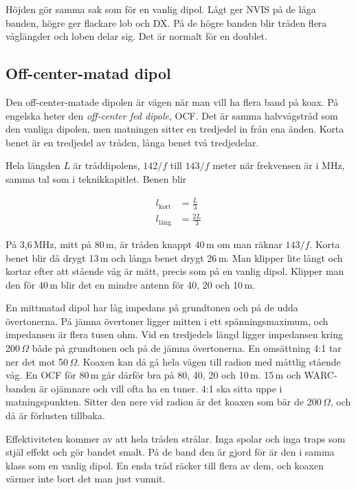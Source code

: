 Höjden gör samma sak som för en vanlig dipol. Lågt ger NVIS på de låga
banden, högre ger flackare lob och DX. På de högre banden blir tråden
flera våglängder och loben delar sig. Det är normalt för en doublet.

\subsection{Off-center-matad dipol}

Den off-center-matade dipolen är vägen när man vill ha flera band på
koax. På engelska heter den \textit{off-center fed dipole}, OCF. Det
är samma halvvågstråd som den vanliga dipolen, men matningen sitter en
tredjedel in från ena änden. Korta benet är en tredjedel av tråden,
långa benet två tredjedelar.

Hela längden $L$ är tråddipolens, $142/f$ till $143/f$ meter när
frekvensen är i MHz, samma tal som i teknikkapitlet. Benen blir

\begin{align}
	l_{\text{kort}} &= \frac{L}{3} \\
	l_{\text{lång}} &= \frac{2L}{3}
\end{align}

På 3,6\,MHz, mitt på 80\,m, är tråden knappt 40\,m om man räknar
$143/f$. Korta benet blir då drygt 13\,m och långa benet drygt 26\,m.
Man klipper lite långt och kortar efter att stående våg är mätt,
precis som på en vanlig dipol. Klipper man den för 40\,m blir det en
mindre antenn för 40, 20 och 10\,m.

En mittmatad dipol har låg impedans på grundtonen och på de udda
övertonerna. På jämna övertoner ligger mitten i ett spänningsmaximum,
och impedansen är flera tusen ohm. Vid en tredjedels längd ligger
impedansen kring 200\,$\Omega$ både på grundtonen och på de jämna
övertonerna. En omsättning 4:1 tar ner det mot 50\,$\Omega$. Koaxen
kan då gå hela vägen till radion med måttlig stående våg. En OCF för
80\,m går därför bra på 80, 40, 20 och 10\,m. 15\,m och WARC-banden är
ojämnare och vill ofta ha en tuner. 4:1 ska sitta uppe i
matningspunkten. Sitter den nere vid radion är det koaxen som bär de
200\,$\Omega$, och då är förlusten tillbaka.

Effektiviteten kommer av att hela tråden strålar. Inga spolar och inga
traps som stjäl effekt och gör bandet smalt. På de band den är gjord
för är den i samma klass som en vanlig dipol. En enda tråd räcker till
flera av dem, och koaxen värmer inte bort det man just vunnit.

